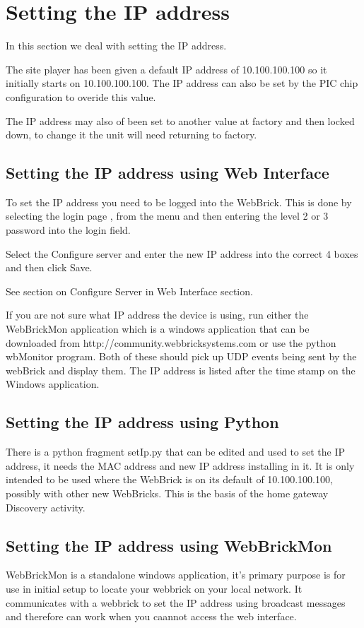 \section {Setting the IP address}

In this section we deal with setting the IP address.

The site player has been given a default IP address of 10.100.100.100 so it initially
starts on 10.100.100.100. The IP address
can also be set by the PIC chip configuration to overide this value.

The IP address may also of been set to another value at factory and then locked down, to change it the unit
will need returning to factory.

\subsection{Setting the IP address using Web Interface}

To set the IP address you need to be logged into the WebBrick.  This is done by selecting the login page , 
from the menu and then entering the level 2 or 3 password into the login field.

Select the Configure server and enter the new IP address into the correct 4 boxes and then click Save.

See section on Configure Server in Web Interface section.

If you are not sure what IP address the device is using, run either the WebBrickMon application which is a windows
application that can be downloaded from http://community.webbricksystems.com or use the python wbMonitor program. 
Both of these should pick up UDP events
being sent by the webBrick and display them. The IP address is listed after the time stamp on the Windows application.

\subsection{Setting the IP address using Python}
There is a python fragment setIp.py that can be edited and used to set the IP address, it needs the MAC address and new 
IP address installing in it. It is only intended to be used where the WebBrick is on its default of 10.100.100.100, 
possibly with other new WebBricks. This is the basis of the home gateway Discovery activity.

\subsection{Setting the IP address using WebBrickMon}
WebBrickMon is a standalone windows application, it's primary purpose is for use in 
initial setup to locate your webbrick on your local network. It communicates with a webbrick to set the IP address
using broadcast messages and therefore can work when you caannot access the web interface.

